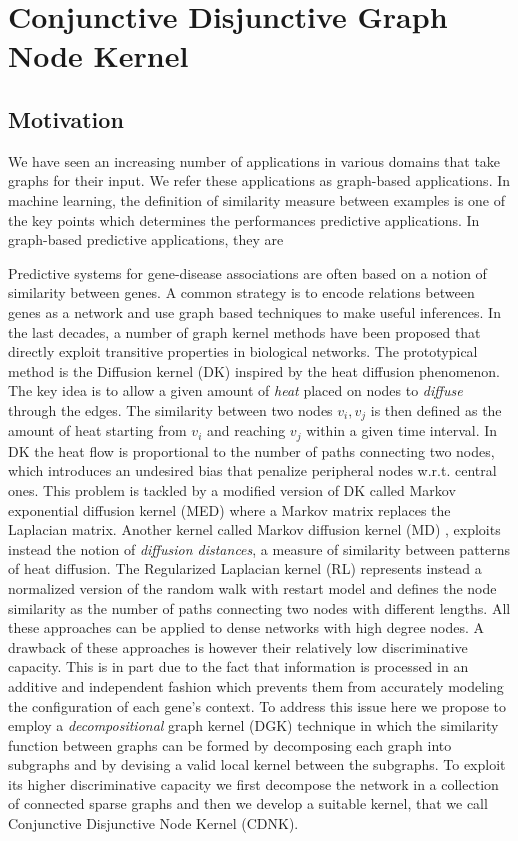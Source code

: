 \chapter{Conjunctive Disjunctive Graph Node Kernel}
\label{chap:cdnk}
\section{Motivation}
We have seen an increasing number of applications in various domains that take graphs for their input. We refer these applications as graph-based applications. In machine learning, the definition of similarity measure between examples is one of the key points which determines the performances predictive applications. In graph-based predictive applications, they are 


Predictive systems for gene-disease associations are often based on a notion of similarity between genes. A common strategy is to encode relations between genes as a network and use graph based techniques to make useful inferences. In the last decades, a number of graph kernel methods have been proposed that directly exploit transitive properties in biological networks. The prototypical method is the Diffusion kernel (DK) \cite{kondor2002diffusion} inspired by the heat diffusion phenomenon. The key idea is to allow a given amount of {\em heat} placed on nodes to {\em diffuse} through the edges. The similarity between two nodes $v_{i}, v_{j}$ is then defined as the amount of heat starting from $v_{i}$ and reaching $v_{j}$ within a given time interval. In DK the heat flow is proportional to the number of paths connecting two nodes, which introduces an undesired bias that penalize peripheral nodes w.r.t. central ones. This problem is tackled by a modified version of DK called Markov exponential diffusion kernel (MED) \cite{chen2014disease} where a Markov matrix replaces the Laplacian matrix.  Another kernel called Markov diffusion kernel (MD) \cite{fouss2006experimental}, exploits instead the notion of {\em diffusion distances}, a measure of similarity between patterns of heat diffusion. The Regularized Laplacian kernel (RL) \cite{chebotarev2006matrix} represents instead a normalized version of the random walk with restart model and defines the node similarity as the number of paths connecting two nodes with different lengths. All these approaches can be applied to dense networks with high degree nodes. A drawback of these approaches is however their relatively low discriminative capacity. This is in part due to the fact that information is processed in an additive and independent fashion which prevents them from accurately modeling the configuration of each gene's context. To address this issue here we propose to employ a {\em decompositional} graph kernel (DGK) \cite{haussler1999convolution} technique in which the similarity function between graphs can be formed by decomposing each graph into subgraphs and by devising a valid local kernel between the subgraphs. To exploit its higher discriminative capacity we first decompose the network in a collection of connected sparse graphs and then we develop a suitable kernel, that we call Conjunctive Disjunctive Node Kernel (CDNK).

